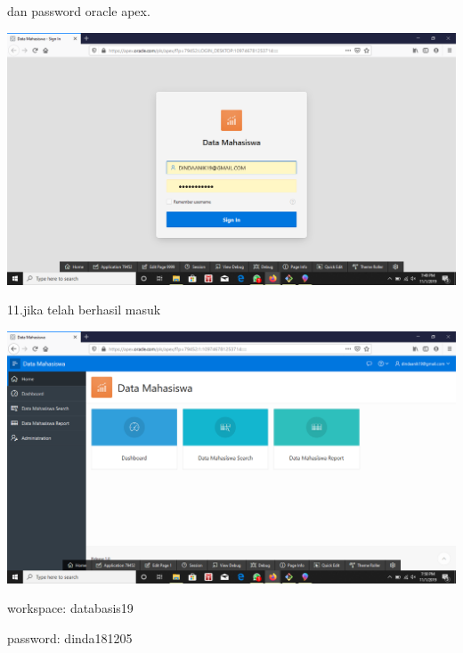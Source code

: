 \documentclass{article}
\begin{document}
dan password oracle apex. 
\begin{center}
 \includegraphics[width=10cm\textwidth]{gambar/11.png}
\end{center}
\item 11.jika telah berhasil masuk
\begin{center}
 \includegraphics[width=10cm\textwidth]{gambar/12.png}
\end{center}
\item workspace: databasis19
\item password: dinda181205 
\end{document}
